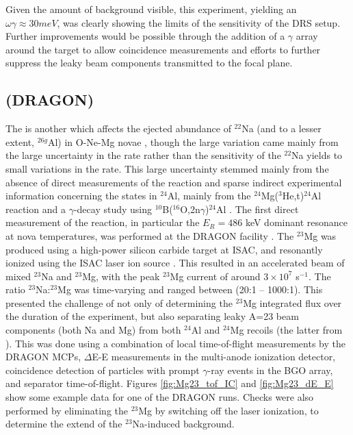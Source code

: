 Given the amount of background visible, this experiment, yielding an $\omega\gamma \approx 30 \unit{meV}$, was clearly showing the limits of the sensitivity of the DRS setup. Further improvements would be possible through the addition of a $\gamma$ array around the target to allow coincidence measurements and efforts to further suppress the leaky beam components transmitted to the focal plane.

\subsection{ (DRAGON)}
The  is another which affects the ejected abundance of $^{22}$Na (and to a lesser extent, $^{26g}$Al) in O-Ne-Mg novae \cite{ili02}, though the large variation came mainly from the large uncertainty in the rate rather than the sensitivity of the $^{22}$Na yields to small variations in the rate. This large uncertainty stemmed mainly from the absence of direct measurements of the reaction and sparse indirect experimental information concerning the states in $^{24}$Al, mainly from the $^{24}$Mg($^{3}$He,t)$^{24}$Al reaction \cite{gre91,kub95,vis07,zeg08} and a $\gamma$-decay study using $^{10}$B($^{16}$O,2n$\gamma$)$^{24}$Al \cite{lot08}. 
The first direct measurement of the  reaction, in particular the $E_{R}=486$ keV dominant resonance at nova temperatures, was performed at the DRAGON facility \cite{eri10}. The $^{23}$Mg was produced using a high-power silicon carbide target at ISAC, and resonantly ionized using the ISAC laser ion source \cite{las09}. This resulted in an accelerated beam of mixed $^{23}$Na and $^{23}$Mg, with the peak $^{23}$Mg current of around $3\times10^{7}$ s$^{-1}$. The ratio $^{23}$Na:$^{23}$Mg was time-varying and ranged between (20:1 -- 1000:1). This presented the challenge of not only of determining the $^{23}$Mg integrated flux over the duration of the experiment, but also separating leaky A=23 beam components (both Na and Mg) from both $^{24}$Al and $^{24}$Mg recoils (the latter from ). This was done using a combination of local time-of-flight measurements by the DRAGON MCPs, $\Delta$E-E measurements in the multi-anode ionization detector, coincidence detection of particles with prompt $\gamma$-ray events in the BGO array, and separator time-of-flight. Figures \ref{fig:Mg23_tof_IC} and \ref{fig:Mg23_dE_E} show some example data for one of the DRAGON  runs. Checks were also performed by eliminating the $^{23}$Mg by switching off the laser ionization, to determine the extend of the $^{23}$Na-induced background.  
